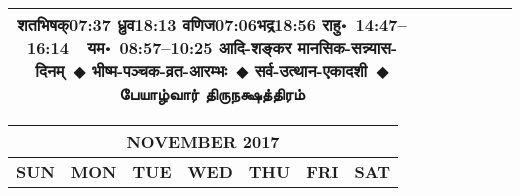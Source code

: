 \documentclass[a3paper,12pt,landscape]{article}
\newcommand{\eventsep}{~$\Diamondblack$ }
\newcommand{\To}{\hspace{1pt}\raisebox{0pt}{\tiny\RIGHTarrow}\hspace{1pt}}
\newcommand{\tamil}[1]{%
{\fontspec[Scale=0.9,FakeStretch=0.9]{Noto Sans Tamil} \footnotesize #1}}
\newcommand{\rahuyama}[2]{%
{राहु॰~\textsf{#1}~~यम॰~\textsf{#2}}
}
\begin{document}
\begin{center}
\begin{tabular}{|c|c|c|c|c|c|c|}
{{\mbox{शतभिषक्\To{}\textsf{07:37\hspace{2ex}}}}%
{\mbox{ध्रुव\To{}\textsf{18:13\hspace{2ex}}}}%
{\mbox{वणिज\To{}\textsf{07:06\hspace{2ex}}}\mbox{भद्र\To{}\textsf{18:56\hspace{2ex}}}}}%
{\rahuyama{14:47--16:14}{08:57--10:25}}%
{आदि-शङ्कर मानसिक-सन्न्यास-दिनम्\eventsep भीष्म-पञ्चक-व्रत-आरम्भः\eventsep सर्व-उत्थान-एकादशी\eventsep \tamil{பேயாழ்வார் திருநக்ஷத்திரம்}}
&
\mbox{}  & %
\mbox{}  & %
\mbox{}  & %
\\ \hline
\end{tabular}



\begin{tabular}{|c|c|c|c|c|c|c|}
\multicolumn{7}{c}{\Large \bfseries \sffamily NOVEMBER 2017}\\[3mm]
\hline
\textbf{\textsf{SUN}} & \textbf{\textsf{MON}} & \textbf{\textsf{TUE}} & \textbf{\textsf{WED}} & \textbf{\textsf{THU}} & \textbf{\textsf{FRI}} & \textbf{\textsf{SAT}} \\ \hline


\end{tabular}
\end{center}
\end{document}
